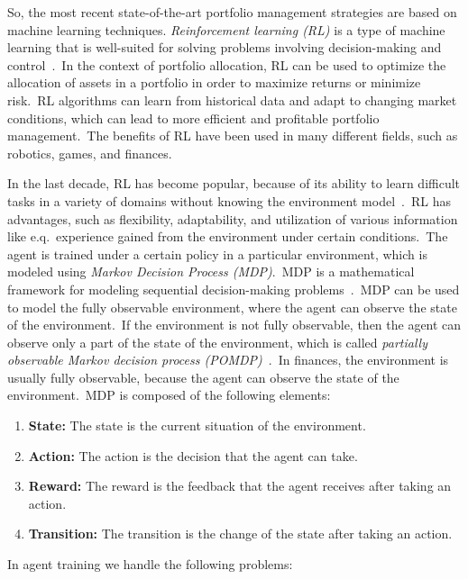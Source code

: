 \documentclass[../xlapes02]{subfiles}
\begin{document}
    So, the most recent state-of-the-art portfolio management strategies are based on machine learning techniques. \emph{Reinforcement learning (RL)} is a type of machine learning that is well-suited for solving problems involving decision-making and control~\cite{sutton2018reinforcement}.\ In the context of portfolio allocation, RL can be used to optimize the allocation of assets in a portfolio in order to maximize returns or minimize risk.\ RL algorithms can learn from historical data and adapt to changing market conditions, which can lead to more efficient and profitable portfolio management.\ The benefits of RL have been used in many different fields, such as robotics, games, and finances.

    In the last decade, RL has become popular, because of its ability to learn difficult tasks in a variety of domains without knowing the environment model~\cite{sutton2018reinforcement}.\ RL has advantages, such as flexibility, adaptability, and utilization of various information like e.q.\ experience gained from the environment under certain conditions.\ The agent is trained under a certain policy in a particular environment, which is modeled using \emph{Markov Decision Process (MDP)}.\ MDP is a mathematical framework for modeling sequential decision-making problems~\cite{rao2022foundations}.\ MDP can be used to model the fully observable environment, where the agent can observe the state of the environment.\ If the environment is not fully observable, then the agent can observe only a part of the state of the environment, which is called \emph{partially observable Markov decision process (POMDP)}~\cite{kurniawati2021partially}.\ In finances, the environment is usually fully observable, because the agent can observe the state of the environment.\ MDP is composed of the following elements:
    \begin{enumerate}[label=\textbf{\arabic*}., ref=\arabic*]
        \item \textbf{State:} The state is the current situation of the environment.
        \item \textbf{Action:} The action is the decision that the agent can take.
        \item \textbf{Reward:} The reward is the feedback that the agent receives after taking an action.
        \item \textbf{Transition:} The transition is the change of the state after taking an action.
    \end{enumerate}
    In agent training we handle the following problems:
\end{document}
